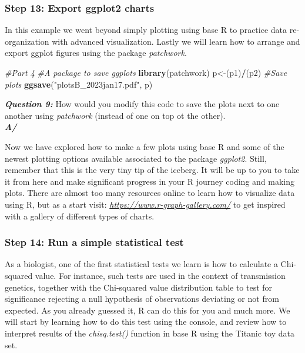 \documentclass[]{article}
\newenvironment{Shaded}{\begin{snugshade}}{\end{snugshade}}
\newcommand{\CommentTok}[1]{\textcolor[rgb]{0.56,0.35,0.01}{\textit{#1}}}
\newcommand{\KeywordTok}[1]{\textcolor[rgb]{0.13,0.29,0.53}{\textbf{#1}}}
\newcommand{\NormalTok}[1]{#1}
\newcommand{\OperatorTok}[1]{\textcolor[rgb]{0.81,0.36,0.00}{\textbf{#1}}}
\newcommand{\StringTok}[1]{\textcolor[rgb]{0.31,0.60,0.02}{#1}}
\begin{document}
\hypertarget{step-13-export-ggplot2-charts}{%
\subsubsection{Step 13: Export ggplot2
charts}\label{step-13-export-ggplot2-charts}}

In this example we went beyond simply plotting using base R to practice
data re-organization with advanced visualization. Lastly we will learn
how to arrange and export ggplot figures using the package
\emph{patchwork}.

\begin{Shaded}
\begin{Highlighting}[]
\CommentTok{#Part 4}
\CommentTok{#A package to save ggplots}
\KeywordTok{library}\NormalTok{(patchwork)}
\NormalTok{p<-(p1)}\OperatorTok{/}\NormalTok{(p2)}
\CommentTok{#Save plots}
\KeywordTok{ggsave}\NormalTok{(}\StringTok{"plotsB_2023jan17.pdf"}\NormalTok{, p)}
\end{Highlighting}
\end{Shaded}

\textbf{\emph{Question 9:}} How would you modify this code to save the
plots next to one another using \emph{patchwork} (instead of one on top
ot the other).\\
\textbf{\emph{A/}}

Now we have explored how to make a few plots using base R and some of
the newest plotting options available associated to the package
\emph{ggplot2}. Still, remember that this is the very tiny tip of the
iceberg. It will be up to you to take it from here and make significant
progress in your R journey coding and making plots. There are almost too
many resources online to learn how to visualize data using R, but as a
start visit: \emph{\url{https://www.r-graph-gallery.com/}} to get
inspired with a gallery of different types of charts.

\hypertarget{step-14-run-a-simple-statistical-test}{%
\subsubsection{Step 14: Run a simple statistical
test}\label{step-14-run-a-simple-statistical-test}}

As a biologist, one of the first statistical tests we learn is how to
calculate a Chi-squared value. For instance, such tests are used in the
context of transmission genetics, together with the Chi-squared value
distribution table to test for significance rejecting a null hypothesis
of observations deviating or not from expected. As you already guessed
it, R can do this for you and much more. We will start by learning how
to do this test using the console, and review how to interpret results
of the \emph{chisq.test()} function in base R using the Titanic toy data
set.
\end{document}
